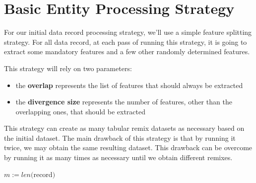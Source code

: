 \documentclass[a4paper,12pt]{article}
\begin{document}
\section{Basic Entity Processing Strategy}
\begin{FlushLeft}
    For our initial data record processing strategy, we'll use a simple feature
    splitting strategy. For all data record, at each pass of running this strategy,
    it is going to extract some mandatory features and a few other randomly
    determined features.
\end{FlushLeft}
\begin{FlushLeft}
    This strategy will rely  on two parameters:
    \begin{itemize}
        \item the \textbf{overlap} represents the list of features that should always be extracted
        \item the \textbf{divergence size} represents the number of features, other than the overlapping ones, that should be extracted
    \end{itemize}
\end{FlushLeft}
\begin{FlushLeft}
    This strategy can create as many tabular remix datasets as necessary based on
    the initial dataset. The main drawback of this strategy is that by running it
    twice, we may obtain the same resulting dataset. This drawback can be overcome
    by running it as many times as necessary until we obtain different remixes.
\end{FlushLeft}
\begin{algorithmic}
\Require$m := len($record$)$
\EndFunction
\end{algorithmic}
\end{document}
